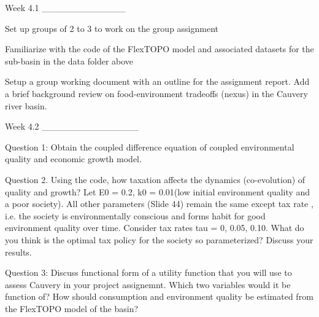 Week 4.1
_____________

Set up groups of 2 to 3 to work on the group assignment

Familiarize with the code of the FlexTOPO model and associated datasets for the sub-basin in the data folder above

Setup a group working document with an outline for the assignment report. Add a brief background review on food-environment tradeoffs (nexus) in the Cauvery river basin. 

Week 4.2 
_______________

Question 1: Obtain the coupled difference equation of coupled environmental quality and economic growth model.

Question 2. Using the code, how taxation affects the dynamics (co-evolution) of quality and growth? Let E0 = 0.2, k0 = 0.01(low initial environment quality and a poor society). All other parameters (Slide 44) remain the same except tax rate , i.e. the society is environmentally conscious and forms habit for good environment quality over time. Consider tax rates tau = 0, 0.05, 0.10. What do you think is the optimal tax policy for the society so parameterized? Discuss your results.

Question 3: Discuss functional form of a utility function that you will use to assess Cauvery in your project assignemnt. Which two variables would it be function of? How should consumption and environment quality be estimated from the FlexTOPO model of the basin?   